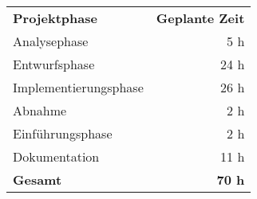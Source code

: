 \begin{tabular}{lr}
\rowcolor{heading}\textbf{Projektphase} & \textbf{Geplante Zeit} \\
Analysephase & 5 h \\
\rowcolor{odd}Entwurfsphase & 24 h \\
Implementierungsphase & 26 h \\
\rowcolor{odd}Abnahme & 2 h \\
Einführungsphase & 2 h \\
\rowcolor{odd}Dokumentation & 11 h \\
\hline
\hline
\rowcolor{odd}\textbf{Gesamt} & \textbf{70 h} \\
\end{tabular}
